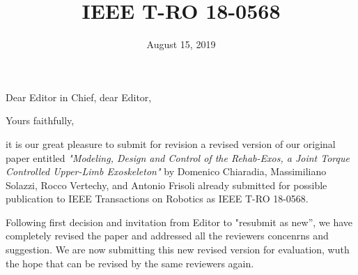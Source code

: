 \documentclass[11pt,a4paper,sans]{moderncv}        %
\title{ IEEE T-RO 18-0568}
\begin{document}



	
	\date{August 15, 2019}
	\opening{ Dear Editor in Chief, dear Editor,}
	\closing{Yours faithfully,}
	\makelettertitle

it is our great pleasure to submit for revision a revised version of our original paper  entitled 
{\em  "Modeling, Design and Control of the Rehab-Exos, a Joint Torque
Controlled Upper-Limb Exoskeleton"}
by Domenico Chiaradia, Massimiliano Solazzi, Rocco Vertechy, and Antonio
Frisoli already  submitted   for possible publication to IEEE Transactions on Robotics as IEEE T-RO 18-0568.

Following first decision and invitation from Editor to "resubmit as new'', we have completely revised the paper and addressed all the reviewers concenrns and suggestion.
We are now submitting this new revised version for evaluation, wuth the hope that can be revised by the same reviewers again.

	

	\makeletterclosing
	
\end{document}
